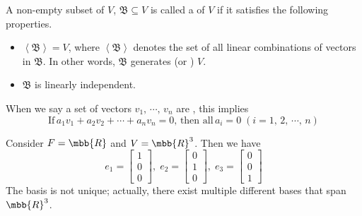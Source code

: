 \documentclass[a4paper, 10pt]{article}
\begin{document}

\begin{definition}
    A non-empty subset of $V$, $\mathfrak{B} \subseteq V$ is called a  of $V$ if it satisfies the following properties.
    \begin{itemize}
        \item[(1)] $\left< \mathfrak{B} \right> = V$, where $\left< \mathfrak{B} \right>$ denotes the set of all linear combinations of vectors in $\mathfrak{B}$.
        In other words, $\mathfrak{B}$ generates (or ) $V$.
        \item[(2)] $\mathfrak{B}$ is linearly independent.
    \end{itemize}
\end{definition}
\begin{remark}
    When we say a set of vectors $v_{1}, \, \cdots, \, v_{n}$ are , this implies
    \[ \text{If} \, a_{1}v_{1} + a_{2}v_{2} + \cdots + a_{n}v_{n} = 0, \, \text{then all} \, a_{i} = 0 \; (i = 1, \, 2, \, \cdots, \, n) \]
\end{remark}
\begin{example}
    Consider $F = \mbb{R}$ and $V = \mbb{R}^{3}$. Then we have 
    \[ e_{1} = \begin{bmatrix}1\\ 0\\ 0\end{bmatrix}, \; e_{2} = \begin{bmatrix}0\\ 1\\ 0\end{bmatrix}, \; e_{3} = \begin{bmatrix}0\\ 0\\ 1\end{bmatrix} \]
    The basis is not unique; actually, there exist multiple different bases that span $\mbb{R}^{3}$.
\end{example}
\end{document}
